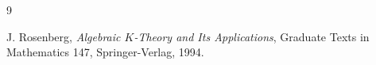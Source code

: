 
{}
\begin{thebibliography}{9}

J. Rosenberg,
\textit{Algebraic $K$-Theory and Its Applications},
Graduate Texts in Mathematics 147, Springer-Verlag, 1994.

\end{thebibliography}
